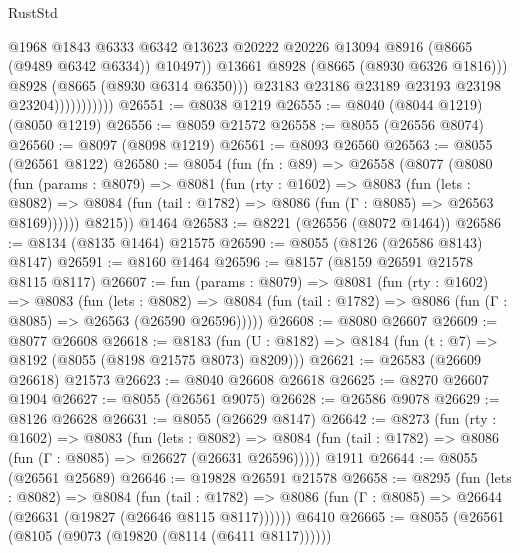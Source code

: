 \begin{lexlean}{RustStd}
\begin{coremodule}
                                  @1968
                                  @1843
                                  @6333
                                  @6342
                                  @13623
                                  @20222
                                  @20226
                                  @13094
                                  @8916
                                  (@8665 (@9489 @6342 @6334))
                                  @10497))
                              @13661
                              @8928
                              (@8665 (@8930 @6326 @1816)))
                            @8928
                            (@8665 (@8930 @6314 @6350)))
                          @23183
                          @23186
                          @23189
                          @23193
                          @23198
                          @23204)))))))))))
@26551 := @8038 @1219
@26555 := @8040 (@8044 @1219) (@8050 @1219)
@26556 := @8059 @21572
@26558 := @8055 (@26556 @8074)
@26560 := @8097 (@8098 @1219)
@26561 := @8093 @26560
@26563 := @8055 (@26561 @8122)
@26580 := @8054
    (fun (fn : @89) =>
    @26558
      (@8077
        (@8080
          (fun (params : @8079) =>
          @8081
            (fun (rty : @1602) =>
            @8083
              (fun (lets : @8082) =>
              @8084 (fun (tail : @1782) => @8086 (fun (Γ : @8085) => @26563 @8169))))))
        @8215))
    @1464
@26583 := @8221 (@26556 (@8072 @1464))
@26586 := @8134 (@8135 @1464) @21575
@26590 := @8055 (@8126 (@26586 @8143) @8147)
@26591 := @8160 @1464
@26596 := @8157 (@8159 @26591 @21578 @8115 @8117)
@26607 := fun (params : @8079) =>
  @8081
    (fun (rty : @1602) =>
    @8083
      (fun (lets : @8082) =>
      @8084 (fun (tail : @1782) => @8086 (fun (Γ : @8085) => @26563 (@26590 @26596)))))
@26608 := @8080 @26607
@26609 := @8077 @26608
@26618 := @8183
    (fun (U : @8182) => @8184 (fun (t : @7) => @8192 (@8055 (@8198 @21575 @8073) @8209)))
@26621 := @26583 (@26609 @26618) @21573
@26623 := @8040 @26608 @26618
@26625 := @8270 @26607 @1904
@26627 := @8055 (@26561 @9075)
@26628 := @26586 @9078
@26629 := @8126 @26628
@26631 := @8055 (@26629 @8147)
@26642 := @8273
    (fun (rty : @1602) =>
    @8083
      (fun (lets : @8082) =>
      @8084 (fun (tail : @1782) => @8086 (fun (Γ : @8085) => @26627 (@26631 @26596)))))
    @1911
@26644 := @8055 (@26561 @25689)
@26646 := @19828 @26591 @21578
@26658 := @8295
    (fun (lets : @8082) =>
    @8084
      (fun (tail : @1782) =>
      @8086 (fun (Γ : @8085) => @26644 (@26631 (@19827 (@26646 @8115 @8117))))))
    @6410
@26665 := @8055 (@26561 (@8105 (@9073 (@19820 (@8114 (@6411 @8117))))))

\end{coremodule}
\end{lexlean}
